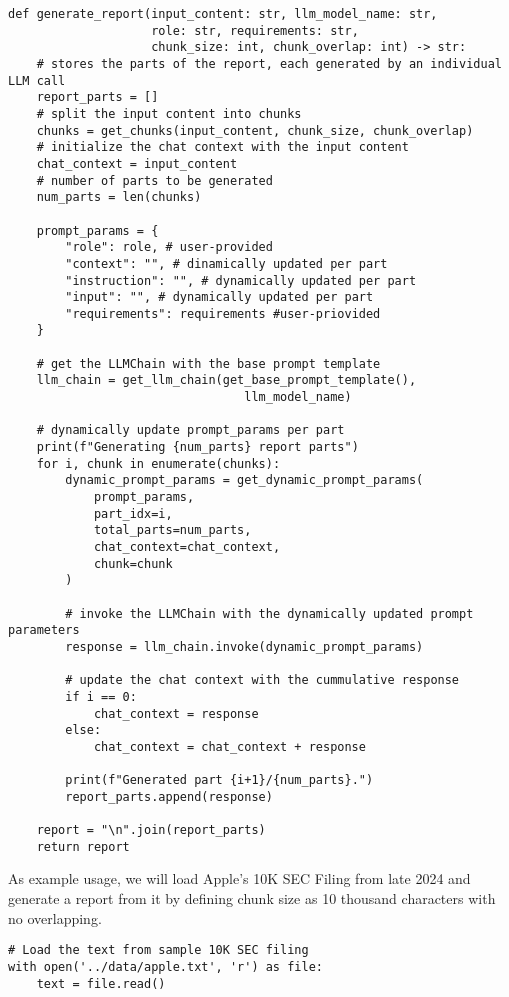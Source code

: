 \begin{verbatim}
def generate_report(input_content: str, llm_model_name: str, 
                    role: str, requirements: str,
                    chunk_size: int, chunk_overlap: int) -> str:
    # stores the parts of the report, each generated by an individual LLM call
    report_parts = [] 
    # split the input content into chunks
    chunks = get_chunks(input_content, chunk_size, chunk_overlap)
    # initialize the chat context with the input content
    chat_context = input_content
    # number of parts to be generated
    num_parts = len(chunks)

    prompt_params = {
        "role": role, # user-provided
        "context": "", # dinamically updated per part
        "instruction": "", # dynamically updated per part
        "input": "", # dynamically updated per part
        "requirements": requirements #user-priovided
    }

    # get the LLMChain with the base prompt template
    llm_chain = get_llm_chain(get_base_prompt_template(), 
                                 llm_model_name)

    # dynamically update prompt_params per part
    print(f"Generating {num_parts} report parts")
    for i, chunk in enumerate(chunks):
        dynamic_prompt_params = get_dynamic_prompt_params(
            prompt_params,
            part_idx=i,
            total_parts=num_parts,
            chat_context=chat_context,
            chunk=chunk
        )
        
        # invoke the LLMChain with the dynamically updated prompt parameters
        response = llm_chain.invoke(dynamic_prompt_params)

        # update the chat context with the cummulative response
        if i == 0:
            chat_context = response
        else:
            chat_context = chat_context + response
            
        print(f"Generated part {i+1}/{num_parts}.")
        report_parts.append(response)

    report = "\n".join(report_parts)
    return report
\end{verbatim}

As example usage, we will load Apple's 10K SEC Filing from late 2024 and generate a report from it by defining chunk size as 10 thousand characters with no overlapping.

\begin{verbatim}
# Load the text from sample 10K SEC filing
with open('../data/apple.txt', 'r') as file:
    text = file.read()
\end{verbatim}

